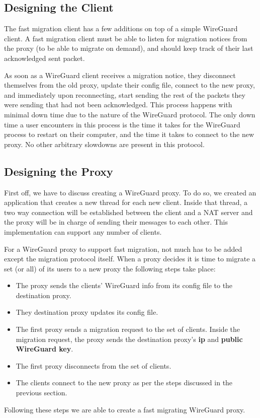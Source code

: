 \documentclass[conference]{IEEEtran}
\begin{document}
\subsection{Designing the Client}
The fast migration client has a few additions on top of a simple WireGuard client. A fast migration client must be able to listen for migration notices from the proxy (to be able to migrate on demand), and should keep track of their last acknowledged sent packet. 

As soon as a WireGuard client receives a migration notice, they disconnect themselves from the old proxy, update their config file, connect to the new proxy, and immediately upon reconnecting, start sending the rest of the packets they were sending that had not been acknowledged. This process happens with minimal down time due to the nature of the WireGuard protocol. The only down time a user encounters in this process is the time it takes for the WireGuard process to restart on their computer, and the time it takes to connect to the new proxy. No other arbitrary slowdowns are present in this protocol.

\subsection{Designing the Proxy}
First off, we have to discuss creating a WireGuard proxy. To do so, we created an application that creates a new thread for each new client. Inside that thread, a two way connection will be established between the client and a NAT server and the proxy will be in charge of sending their messages to each other. This implementation can support any number of clients.

For a WireGuard proxy to support fast migration, not much has to be added except the migration protocol itself. When a proxy decides it is time to migrate a set (or all) of its users to a new proxy the following steps take place:
\begin{itemize}
    \item The proxy sends the clients' WireGuard info from its config file to the destination proxy.
    \item They destination proxy updates its config file.
    \item The first proxy sends a migration request to the set of clients. Inside the migration request, the proxy sends the destination proxy's \textbf{ip} and \textbf{public WireGuard key}.
    \item The first proxy disconnects from the set of clients.
    \item The clients connect to the new proxy as per the steps discussed in the previous section.
\end{itemize}

Following these steps we are able to create a fast migrating WireGuard proxy.


\printbibliography
\end{document}
